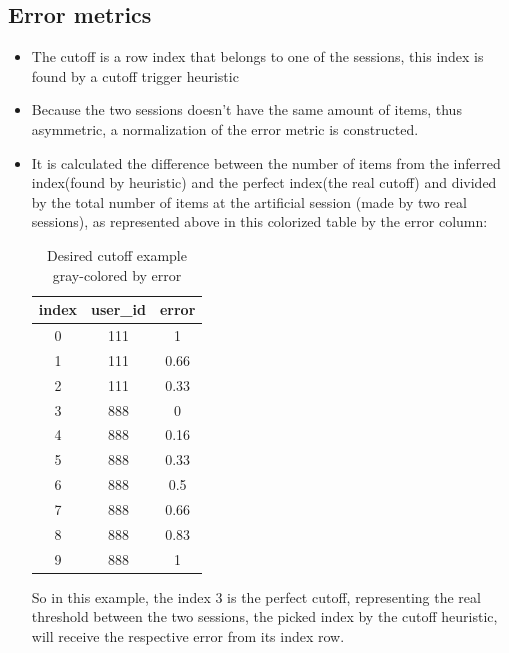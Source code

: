 \documentclass[ecp,tc,english]{iiufrgs}
\begin{document}
        \subsection{Error metrics}
        \begin{itemize}
            \item The cutoff is a row index that belongs to one of the sessions, this index is found by a cutoff trigger heuristic
            \item Because the two sessions doesn't have the same amount of items, thus asymmetric, a normalization of the error metric is constructed.
            \item It is calculated the difference between the number of items from the inferred index(found by heuristic) and the perfect index(the real cutoff) and divided by the total number of items at the artificial session (made by two real sessions), as represented above in this colorized table by the error column:
            
            \begin{table}[!ht]
                \centering
                \begin{tabular}{c|c|c}
                    \hline
                    \rowcolor[RGB]{239,239,239}
                    index & user\_id & error \\
                    \hline 
                    \rowcolor[RGB]{140,140,140}
                    0 & 111 & 1 \\ 
                    \rowcolor[RGB]{197,197,197}
                    1 & 111 & 0.66 \\ 
                    \rowcolor[RGB]{226,226,226}
                    2 & 111 & 0.33 \\ 
                    \rowcolor[RGB]{255,255,255}
                    3 & 888 & 0 \\ 
                    \rowcolor[RGB]{239,239,239}
                    4 & 888 & 0.16 \\ 
                    \rowcolor[RGB]{222,222,222}
                    5 & 888 & 0.33 \\ 
                    \rowcolor[RGB]{206,206,206}
                    6 & 888 & 0.5 \\ 
                    \rowcolor[RGB]{189,189,189}
                    7 & 888 & 0.66 \\ 
                    \rowcolor[RGB]{173,173,173}
                    8 & 888 & 0.83 \\ 
                    \rowcolor[RGB]{140,140,140}
                    9 & 888 & 1 \\ 
                    \hline
                \end{tabular}
                \caption{Desired cutoff example gray-colored by error}
                \label{tab:cutoff_table}
            \end{table}
            
            So in this example, the index 3 is the perfect cutoff, representing the real threshold between the two sessions, the picked index by the cutoff heuristic, will receive the respective error from its index row.
        \end{itemize} 
        
\end{document}

